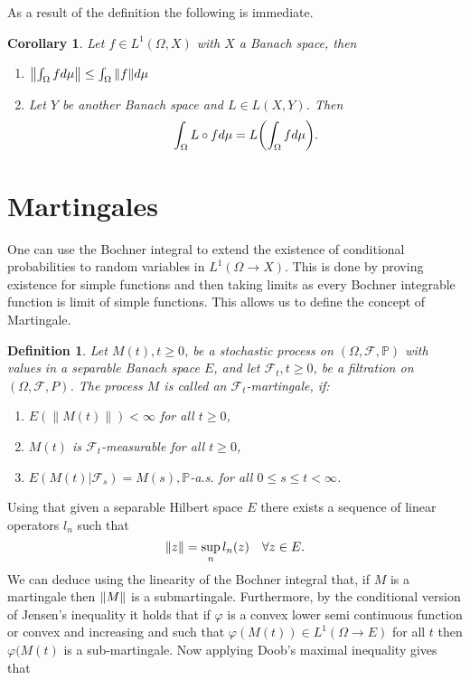 \documentclass[12pt]{article}
\newtheorem{definition}{Definition}
\newtheorem{corollary}{Corollary}
\begin{document}
As a result of the definition the following is immediate.
\begin{corollary}
	Let $f\in L^1(\Omega,X)$ with $X$ a Banach space, then
	\begin{enumerate}
		\item $\norm{\int_\Omega f d\mu}\leq\int_\Omega{\norm{f}d\mu} $
		\item Let $Y$ be another Banach space and $L\in L(X,Y)$. Then
		      \begin{equation*}
			      \int_\Omega L\circ f d\mu=L\qty(\int_\Omega f d\mu).
		      \end{equation*}
	\end{enumerate}
\end{corollary}


\section{Martingales}
One can use the Bochner integral to extend the existence of conditional probabilities to random variables in $L^1(\Omega\to X)$. This is done by proving existence for simple functions and then taking limits as every Bochner integrable function is limit of simple functions. This allows us to define the concept of Martingale.
\begin{definition}
	Let $M(t), t \geq 0$, be a stochastic process on $(\Omega, \mathcal{F}, \mathbb{P})$ with values in a separable Banach space $E$, and let $\mathcal{F}_{t}, t \geq 0$, be a filtration on $(\Omega, \mathcal{F}, P)$.
	The process $M$ is called an $\mathcal{F}_{t}$-martingale, if:
	\begin{enumerate}
		\item $E(\|M(t)\|)<\infty$ for all $t \geq 0$,
		\item $M(t)$ is $\mathcal{F}_{t}$-measurable for all $t \geq 0$,
		\item $E\left(M(t) |\mathcal{F}_{s}\right)=M(s), \mathbb{P}$-a.s. for all $0 \leq s \leq t<\infty$.
	\end{enumerate}
\end{definition}
Using that given a separable Hilbert space $E$ there exists a sequence of linear operators $l_n$ such that
\begin{equation*}
	\norm{z}=\sup_n l_n(z)\quad\forall z\in E.
\end{equation*}
We can deduce using the linearity of the Bochner integral that, if $M$ is a martingale then $\norm{M}$ is a submartingale. Furthermore, by the conditional version of Jensen's inequality it holds that if $\varphi$ is a convex lower semi continuous function or convex and increasing and such that $\varphi(M(t))\in L^1(\Omega\to E)$ for all $t$ then $\varphi(M(t)$ is a sub-martingale. Now applying Doob's maximal inequality gives that
\end{document}
